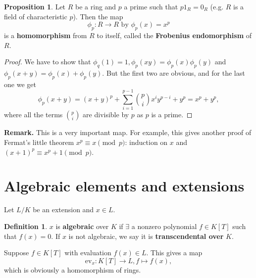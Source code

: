 \documentclass{article}
\theoremstyle{definition}
\newtheorem{prop}[theorem]{Proposition}
\newtheorem{defn}{Definition}[section]
\begin{document}

\begin{prop}
    Let $R$ be a ring and $p$ a prime such that $p 1_{R} = 0_R$ (e.g. $R$ is a field of characteristic $p$). Then the map $$\phi_p: R \to R \text{ by }  \phi_p(x) = x^p$$ is a \textbf{homomorphism} from $R$ to itself, called the \textbf{Frobenius endomorphism} of $R$. 
\end{prop}
\begin{proof}
    We have to show that $\phi_q(1)=1, \phi_p(xy)= \phi_p(x)\phi_p(y)$ and $\phi_p(x+y)= \phi_p(x) + \phi_p(y)$. But the first two are obvious, and for the last one we get \[
    \phi_p(x+y) = (x+y)^{p} + \sum_{i=1}^{p-1} {{p} \choose {i}} x^i y^{p-i} + y^p = x^p + y^p
    ,\]
    where all the terms ${{p}\choose{i}}$ are divisible by $p$ as $p$ is a prime.
\end{proof}
\textbf{Remark.} This is a very important map. For example, this gives another proof of Fermat's little theorem $x^p \equiv x \pmod{p}$: induction on $x$ and $(x+1)^p \equiv x^p + 1 \pmod{p}$.

\section{Algebraic elements and extensions}
Let $L/K$ be an extension and $x \in L$. 
\begin{defn}
    $x$ is \textbf{algebraic} over $K$ if $\exists$ a nonzero polynomial $f \in K[T]$ such that $f(x)=0$. If $x$ is not algebraic, we say it is \textbf{transcendental over} $K$.
\end{defn}
Suppose $f \in K[T]$ with evaluation $f(x) \in L$. This gives a map $$\text{ev}_x : K[T] \to L, f \mapsto f(x),$$ which is obviously a homomorphism of rings.
\vspace{1mm}
\end{document}
